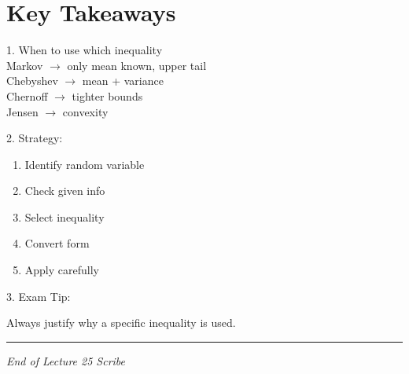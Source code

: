 \documentclass[11pt]{article}
\begin{document}
\vspace{0.5cm}

\section*{Key Takeaways}

1. When to use which inequality \\
Markov $\rightarrow$ only mean known, upper tail \\
Chebyshev $\rightarrow$ mean + variance \\
Chernoff $\rightarrow$ tighter bounds \\
Jensen $\rightarrow$ convexity

\vspace{0.3cm}

2. Strategy:
\begin{enumerate}
\item Identify random variable
\item Check given info
\item Select inequality
\item Convert form
\item Apply carefully
\end{enumerate}

\vspace{0.3cm}

3. Exam Tip:

Always justify why a specific inequality is used.

\bigskip
\hrule

\begin{center}
\small \textit{End of Lecture 25 Scribe}
\end{center}
\end{document}
